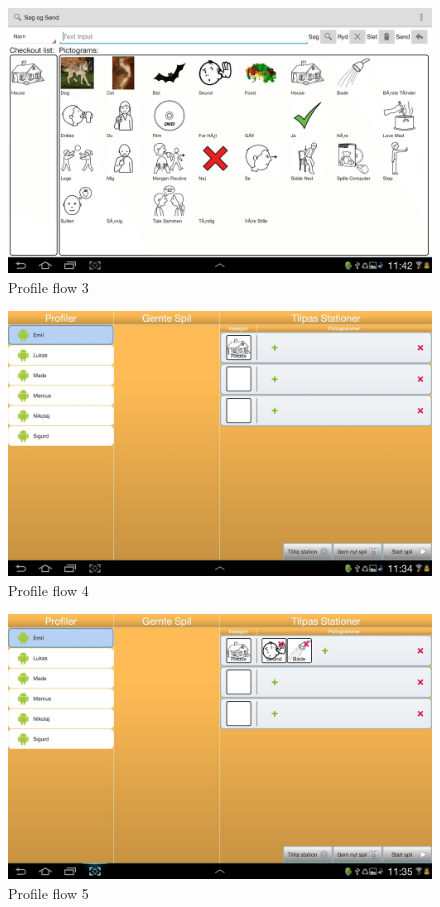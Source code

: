 \begin{figure}[H]
\centering
\includegraphics[width=0.9\linewidth]{img/screenshots/profile_flow_3.jpg}%
\caption{Profile flow 3}
\label{fig:profile_flow_3}
\end{figure}

\begin{figure}[H]
\centering
\includegraphics[width=0.9\linewidth]{img/screenshots/profile_flow_4.jpg}%
\caption{Profile flow 4}
\label{fig:profile_flow_4}
\end{figure}

\begin{figure}[H]
\centering
\includegraphics[width=0.9\linewidth]{img/screenshots/profile_flow_5.jpg}%
\caption{Profile flow 5}
\label{fig:profile_flow_5}
\end{figure}

